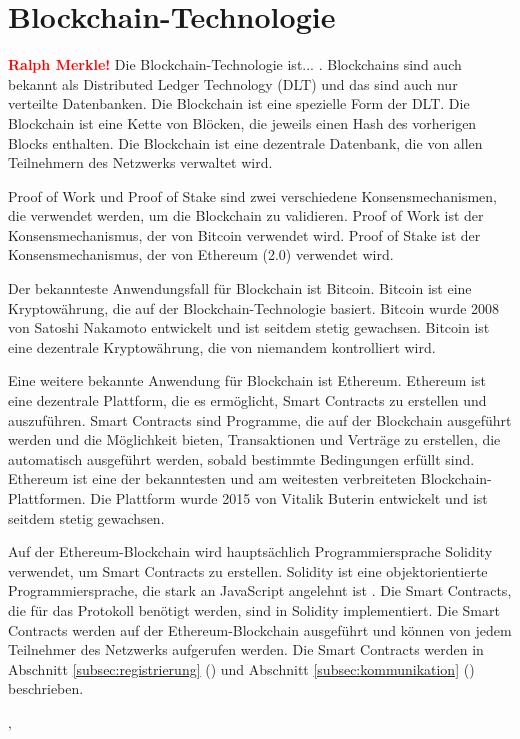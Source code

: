 \section{Blockchain-Technologie}
\textbf{\textcolor{red}{Ralph Merkle!}}
Die Blockchain-Technologie ist... . Blockchains sind auch bekannt als Distributed Ledger 
Technology (DLT) und das sind auch nur verteilte Datenbanken. Die Blockchain ist eine
spezielle Form der DLT. Die Blockchain ist eine Kette von Blöcken, die jeweils einen
Hash des vorherigen Blocks enthalten. Die Blockchain ist eine dezentrale Datenbank, die
von allen Teilnehmern des Netzwerks verwaltet wird.

Proof of Work und Proof of Stake sind zwei verschiedene Konsensmechanismen, die verwendet
werden, um die Blockchain zu validieren. Proof of Work ist der Konsensmechanismus, der
von Bitcoin verwendet wird. Proof of Stake ist der Konsensmechanismus, der von Ethereum (2.0)
verwendet wird.

Der bekannteste Anwendungsfall für Blockchain ist Bitcoin. Bitcoin ist eine Kryptowährung,
die auf der Blockchain-Technologie basiert. Bitcoin wurde 2008 von Satoshi Nakamoto entwickelt
und ist seitdem stetig gewachsen. Bitcoin ist eine dezentrale Kryptowährung, die von niemandem
kontrolliert wird.

Eine weitere bekannte Anwendung für Blockchain ist Ethereum. Ethereum ist eine dezentrale
Plattform, die es ermöglicht, Smart Contracts zu erstellen und auszuführen. Smart Contracts
sind Programme, die auf der Blockchain ausgeführt werden und die Möglichkeit bieten, Transaktionen und
Verträge zu erstellen, die automatisch ausgeführt werden, sobald bestimmte Bedingungen erfüllt sind.
Ethereum ist eine der bekanntesten und am weitesten verbreiteten Blockchain-Plattformen. Die Plattform
wurde 2015 von Vitalik Buterin entwickelt und ist seitdem stetig gewachsen.


Auf der Ethereum-Blockchain wird hauptsächlich Programmiersprache Solidity verwendet, um Smart Contracts zu erstellen. Solidity ist eine objektorientierte Programmiersprache, die stark an JavaScript angelehnt ist \parencite[S. 131]{Antonopoulos_MasteringEthereum}. Die Smart Contracts, die für das Protokoll benötigt werden, sind in Solidity implementiert. Die Smart Contracts werden auf der Ethereum-Blockchain ausgeführt und können von jedem Teilnehmer des Netzwerks aufgerufen werden. Die Smart Contracts werden in Abschnitt \ref{subsec:registrierung} () und Abschnitt \ref{subsec:kommunikation} () beschrieben.


‚